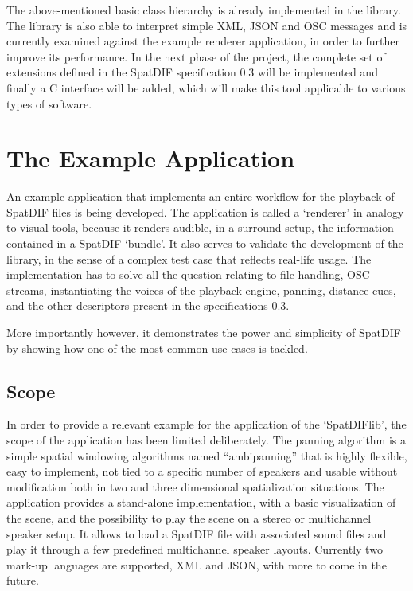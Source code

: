 \documentclass[a4paper]{article}
\begin{document}
The above-mentioned basic class hierarchy is already implemented in the library. 
The library is also able to interpret simple XML, JSON and OSC messages and is currently examined against the example renderer application, in order to further improve its performance.  
In the next phase of the project, the complete set of extensions defined in the SpatDIF specification 0.3 \cite{SpatDIF:Specs} will be implemented and finally a C interface will be added, which will make this tool applicable to various types of software. 

\section{The Example Application}%

An example application that implements an entire workflow for the playback of SpatDIF files is being developed. The application is called a `renderer' in analogy to visual tools, because it renders audible, in a surround setup, the information contained in a SpatDIF `bundle'.
It also serves to validate the development of the library, in the sense of a complex test case that reflects real-life usage.
The implementation has to solve all the question relating to file-handling, OSC-streams, instantiating the voices of the playback engine, panning, distance cues, and the other descriptors present in the specifications 0.3.

More importantly however, it demonstrates the power and simplicity of SpatDIF by showing how one of the most common use cases is tackled.

\subsection{Scope}

In order to provide a relevant example for the application of the `SpatDIFlib', the scope of the application has been limited deliberately.
The panning algorithm is a simple spatial windowing algorithms named ``ambipanning'' \cite{Neukom:2008ambipan} that %
is highly flexible, easy to implement, not tied to a specific number of speakers and usable without modification both in two and three dimensional spatialization situations.
The application provides a stand-alone implementation, with a basic visualization of the scene, and the possibility to play the scene on a stereo or multichannel speaker setup.
It allows to load a SpatDIF file with associated sound files and play it through a few predefined multichannel speaker layouts.
Currently two mark-up languages are supported, XML and JSON, with more to come in the future.
\end{document}
